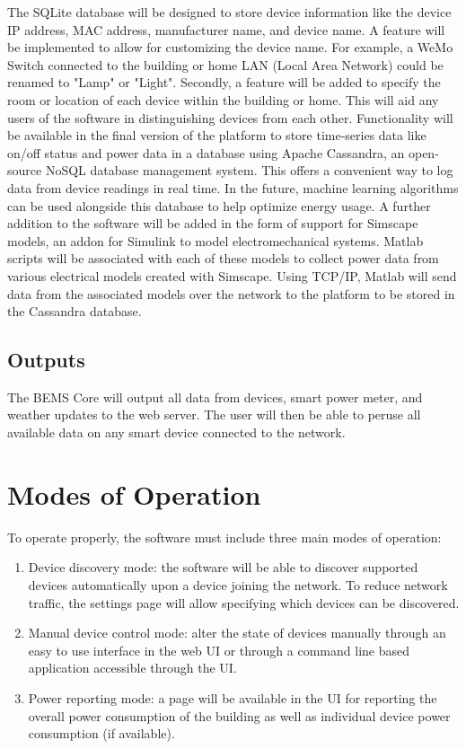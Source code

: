 \documentclass[12pt]{article} %
\begin{document}
\medbreak\noindent
The SQLite database will be designed to store device information like the device IP address, MAC address, manufacturer name, and device name. A feature will be implemented to allow for customizing the device name. For example, a WeMo Switch connected to the building or home LAN (Local Area Network) could be renamed to "Lamp" or "Light". Secondly, a feature will be added to specify the room or location of each device within the building or home. This will aid any users of the software in distinguishing devices from each other. 
\medbreak\noindent
Functionality will be available in the final version of the platform to store time-series data like on/off status and power data in a database using Apache Cassandra, an open-source NoSQL database management system. This offers a convenient way to log data from device readings in real time. In the future, machine learning algorithms can be used alongside this database to help optimize energy usage.
\medbreak\noindent
A further addition to the software will be added in the form of support for Simscape models, an addon for Simulink to model electromechanical systems. Matlab scripts will be associated with each of these models to collect power data from various electrical models created with Simscape. Using TCP/IP, Matlab will send data from the associated models over the network to the platform to be stored in the Cassandra database.

\subsection{Outputs}
The BEMS Core will output all data from devices, smart power meter, and weather updates to the web server. The user will then be able to peruse all available data on any smart device connected to the network.

\section{Modes of Operation}
To operate properly, the software must include three main modes of operation:
\indent
\begin{enumerate}[leftmargin=*,start=0,label={\bfseries Mode~\#\arabic*:}]
    \item Device discovery mode: the software will be able to discover supported devices automatically upon a device joining the network. To reduce network traffic, the settings page will allow specifying which devices can be discovered.
    \item Manual device control mode: alter the state of devices manually through an easy to use interface in the web UI or through a command line based application accessible through the UI.
    \item Power reporting mode: a page will be available in the UI for reporting the overall power consumption of the building as well as individual device power consumption (if available). 
\end{enumerate}
\end{document}
